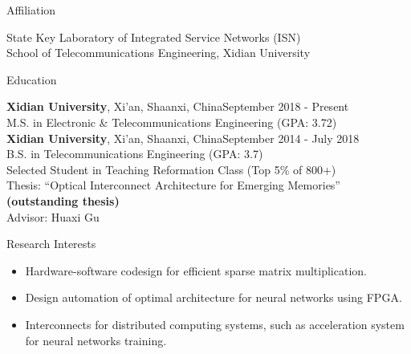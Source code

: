 \documentclass{resume} %
\begin{document}
\begin{rSection}{Affiliation}

State Key Laboratory of Integrated Service Networks (ISN)\\
School of Telecommunications Engineering, Xidian University

\end{rSection}


\begin{rSection}{Education}


{\bf Xidian University}, {Xi'an, Shaanxi, China}\hfill {September 2018 - Present} \\
M.S. in Electronic \& Telecommunications Engineering (GPA: 3.72) \\

{\bf Xidian University}, {Xi'an, Shaanxi, China}\hfill {September 2014 - July 2018} \\
B.S. in Telecommunications Engineering (GPA: 3.7) \\
Selected Student in Teaching Reformation Class (Top 5\% of 800+) \\
Thesis: ``Optical Interconnect Architecture for Emerging Memories” {\bf (outstanding thesis)}\\
Advisor: Huaxi Gu


\end{rSection}

\begin{rSection}{Research Interests}
\begin{itemize}
	\item Hardware-software codesign for efficient sparse matrix multiplication.
	\item Design automation of optimal architecture for neural networks using FPGA.
	\item Interconnects for distributed computing systems, such as acceleration system for neural networks training.
\end{itemize}
\end{rSection}
\end{document}
